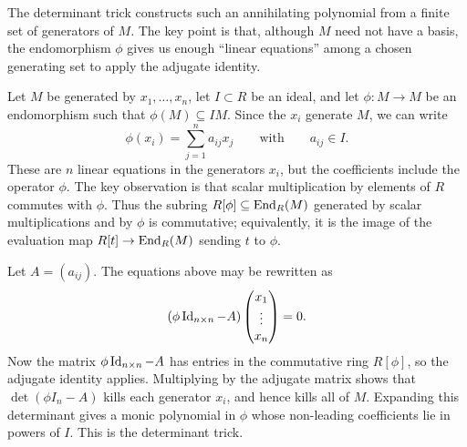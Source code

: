 \documentclass[Notebook.tex]{subfiles}
\begin{document}
The determinant trick constructs such an annihilating polynomial from a finite set of generators of $M$. The key point is that, although $M$ need not have a
basis, the endomorphism $\phi$ gives us enough ``linear equations'' among a chosen generating set to apply the adjugate identity.

Let $M$ be generated by $x_1,\ldots,x_n$, let $I\subset R$ be an ideal, and let $\phi:M\to M$ be an endomorphism such that $\phi(M)\subseteq IM$. Since the $x_i$ generate $M$, we can write
\[
\phi(x_i)=\sum_{j=1}^n a_{ij}x_j
\qquad\text{with}\qquad a_{ij}\in I.
\]
These are $n$ linear equations in the generators $x_i$, but the coefficients include the operator $\phi$. The key observation is that scalar multiplication by elements of $R$ commutes with $\phi$. Thus the subring $R[\phi]\subseteq \operatorname{End}_R(M)$ generated by scalar multiplications and by $\phi$ is commutative; equivalently, it is the image of the evaluation map $R[t]\to \operatorname{End}_R(M)$ sending $t$ to $\phi$.

Let $A=(a_{ij})$. The equations above may be rewritten as
\[
(\phi \operatorname{Id}_{n\times n}-A)
\begin{pmatrix}
 x_1\\ \vdots \\ x_n
\end{pmatrix}=0.
\]
Now the matrix $\phi \operatorname{Id}_{n\times n}-A$ has entries in the commutative ring $R[\phi]$, so the adjugate identity applies. Multiplying by the adjugate matrix shows that $\det(\phi I_n-A)$ kills each generator $x_i$, and hence kills all of $M$. Expanding this determinant gives a monic polynomial in $\phi$ whose non-leading coefficients lie in powers of $I$. This is the determinant trick.


\hrulefill
\end{document}
